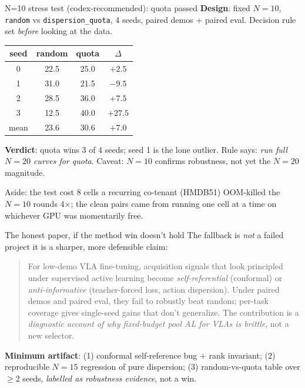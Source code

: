 \documentclass[aspectratio=169]{beamer}
\newcommand{\good}[1]{\textcolor{good}{#1}}
\newcommand{\bad}[1]{\textcolor{bad}{#1}}
\newcommand{\muted}[1]{\textcolor{muted}{#1}}
\begin{document}
\begin{frame}{N=10 stress test (codex-recommended): \good{quota passed}}
\textbf{Design}: fixed $N{=}10$, \texttt{random} vs \texttt{dispersion\_quota}, 4 seeds, paired demos + paired eval. Decision rule set \emph{before} looking at the data.

\vspace{0.6em}
\centering
\begin{tabular}{c|cc|c}
\toprule
seed & random & quota & $\Delta$ \\
\midrule
0 & 22.5 & 25.0 & $+2.5$ \\
1 & 31.0 & 21.5 & \bad{$-9.5$} \\
2 & 28.5 & 36.0 & \good{$+7.5$} \\
3 & 12.5 & 40.0 & \good{$+27.5$} \\
\midrule
mean & 23.6 & \good{30.6} & \good{$\mathbf{+7.0}$} \\
\bottomrule
\end{tabular}

\vspace{0.6em}
\raggedright
\textbf{Verdict}: quota wins \good{3 of 4} seeds; seed 1 is the lone outlier. Rule says: \emph{run full $N{=}20$ curves for quota}. Caveat: $N{=}10$ confirms robustness, not yet the $N{=}20$ magnitude.

\vspace{0.4em}
\muted{\footnotesize Aside: the test cost 8 cells \textemdash{} a recurring co-tenant (HMDB51) OOM-killed the $N{=}10$ rounds 4$\times$; the clean pairs came from running one cell at a time on whichever GPU was momentarily free.}
\end{frame}

\begin{frame}{The honest paper, if the method win doesn't hold}
The fallback is \emph{not} a failed project \textemdash{} it is a sharper, more defensible claim:

\vspace{0.6em}
\begin{quote}
\small
For low-demo VLA fine-tuning, acquisition signals that look principled under supervised active learning become \emph{self-referential} (conformal) or \emph{anti-informative} (teacher-forced loss, action dispersion). Under paired demos and paired eval, they fail to robustly beat random; per-task coverage gives single-seed gains that don't generalize. The contribution is a \emph{diagnostic account of why fixed-budget pool AL for VLAs is brittle}, not a new selector.
\end{quote}

\vspace{0.4em}
\textbf{Minimum artifact}: (1) conformal self-reference bug $+$ rank invariant; (2) reproducible $N{=}15$ regression of pure dispersion; (3) random-vs-quota table over $\geq$2 seeds, \emph{labelled as robustness evidence}, not a win.
\end{frame}
\end{document}
